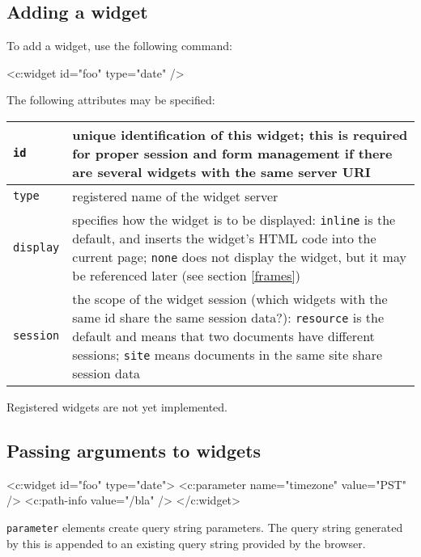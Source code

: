 \documentclass[a4paper,12pt]{article}
\begin{document}
\subsection{Adding a widget}

To add a widget, use the following command:

\begin{verbatim*}
<c:widget id="foo" type="date" />
\end{verbatim*}

The following attributes may be specified:

\begin{tabular}{|l|p{8cm}|}
\hline
\texttt{id} & unique identification of this widget; this is required
for proper session and form management if there are several widgets
with the same server URI \\
\hline
\texttt{type} & registered name of the widget server \\

\hline

\texttt{display} & specifies how the widget is to be displayed:
\texttt{inline} is the default, and inserts the widget's HTML code
into the current page; \texttt{none} does not display the widget, but
it may be referenced later (see section \ref{frames}) \\

\hline
\texttt{session} & the scope of the widget session (which widgets with
the same id share the same session data?): \texttt{resource} is the
default and means that two documents have different sessions;
\texttt{site} means documents in the same site share session data \\

\hline
\end{tabular}

Registered widgets are not yet implemented.

\subsection{Passing arguments to widgets}

\begin{verbatim*}
<c:widget id="foo" type="date">
  <c:parameter name="timezone" value="PST" />
  <c:path-info value="/bla" />
</c:widget>
\end{verbatim*}

\texttt{parameter} elements create query string parameters.  The query
string generated by this is appended to an existing query string
provided by the browser.
\end{document}
